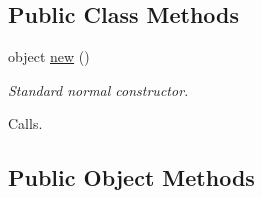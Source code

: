 \subsection*{Public Class Methods}
\label{_amgrp76489900c371cf7d2ca502e43fa26e8e}
 \begin{DoxyCompactItemize}
\item 
object \hyperlink{classChart_1_1Base_a73931fdf090999a07299c1b42d23ae9d}{new} ()
\begin{DoxyCompactList}\small\item\em Standard normal constructor.\par
 Calls. \item\end{DoxyCompactList}\end{DoxyCompactItemize}
\subsection*{Public Object Methods}
\label{_amgrpfb74d91261823cc595bbeff1eff2b9d5}
